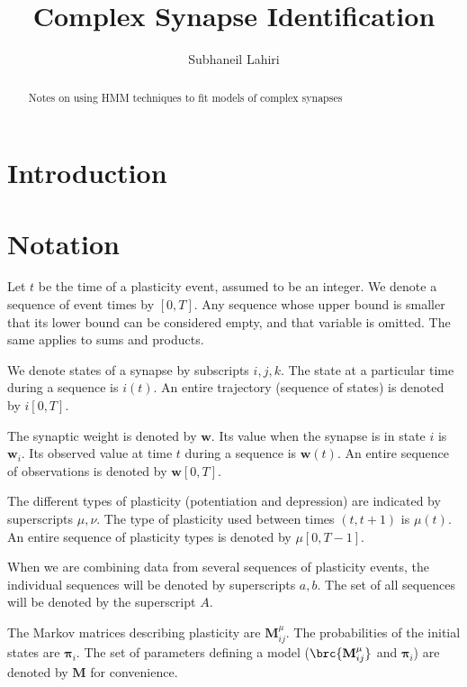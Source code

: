 \documentclass[12pt]{article}
\title{Complex Synapse Identification}%
\author{Subhaneil Lahiri}%
\newcommand{\pib}{\boldsymbol{\pi}}
\newcommand{\w}{\mathbf{w}}
\newcommand{\M}{\mathbf{M}}
\begin{document}
\maketitle
\begin{abstract}
  Notes on using HMM techniques to fit models of complex synapses
\end{abstract}

\section{Introduction \label{sec:intro}}






\section{Notation \label{sec:notation}}

Let $t$ be the time of a plasticity event, assumed to be an integer. 
We denote a sequence of event times by $[0,T]$.
Any sequence whose upper bound is smaller that its lower bound can be considered empty, and that variable is omitted.
The same applies to sums and products.

We denote states of a synapse by subscripts $i,j,k$. 
The state at a particular time during a sequence is $i(t)$.
An entire trajectory (sequence of states) is denoted by $i[0,T]$.

The synaptic weight is denoted by $\w$.
Its value when the synapse is in state $i$ is $\w_i$.
Its observed value at time $t$ during a sequence is $\w(t)$.
An entire sequence of observations is denoted by $\w[0,T]$.

The different types of plasticity (\eg potentiation and depression) are indicated by superscripts $\mu,\nu$.
The type of plasticity used between times $(t,t+1)$ is $\mu(t)$.
An entire sequence of plasticity types is denoted by $\mu[0,T-1]$.

When we are combining data from several sequences of plasticity events, the individual sequences will be denoted by superscripts $a,b$.
The set of all sequences will be denoted by the superscript $A$.

The Markov matrices describing plasticity are $\M^\mu_{ij}$.
The probabilities of the initial states are $\pib_i$.
The set of parameters defining a model (\ie $\brc{\M^\mu_{ij}}$ and $\pib_i$) are denoted by $\M$ for convenience.
\end{document}
